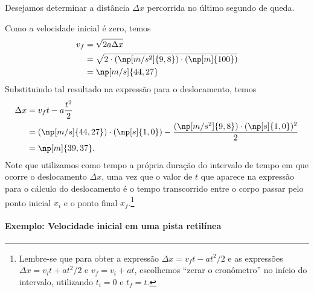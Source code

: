 \begin{marginfigure}
\centering
{}
\caption{Desejamos determinar a distância $\Delta x$ percorrida no último segundo de queda.\label{Fig:DeslUltimoSegQueda}}
\end{marginfigure}

Como a velocidade inicial é zero, temos
\begin{align}
    v_f &= \sqrt{2 a \Delta x} \\
    &= \sqrt{2 \cdot (\np[m/s^2]{9,8}) \cdot (\np[m]{100})} \\
    &= \np[m/s]{44,27}
\end{align}
%
Substituindo tal resultado na expressão para o deslocamento, temos
\begin{align}
    \Delta x &= v_f t - a\frac{t^2}{2} \\
    &= (\np[m/s]{44,27})\cdot(\np[s]{1,0}) - \frac{(\np[m/s^2]{9,8})\cdot(\np[s]{1,0})^2}{2} \\
    &= \np[m]{39,37}.
\end{align}
%
Note que utilizamos como tempo a própria duração do intervalo de tempo em que ocorre o deslocamento $\Delta x$, uma vez que o valor de $t$ que aparece na expressão para o cálculo do deslocamento é o tempo transcorrido entre o corpo passar pelo ponto inicial $x_i$ e o ponto final $x_f$.\footnote{Lembre-se que para obter a expressão $\Delta x = v_ft-at^2/2$ e as expressões $\Delta x = v_it+at^2/2$ e $v_f = v_i + a t$, escolhemos ``zerar o cronômetro'' no início do intervalo, utilizando $t_i = 0$ e $t_f = t$.}

\paragraph{Exemplo: Velocidade inicial em uma pista retilínea}

